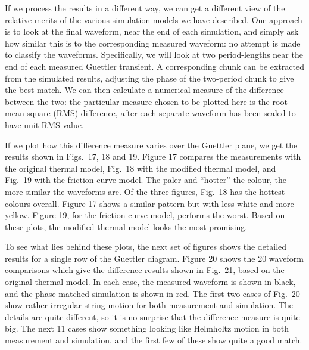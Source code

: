   If we process the results in a different way, we can get a different view of 
  the relative merits of the various simulation models we have described. One 
  approach is to look at the final waveform, near the end of each simulation, 
  and simply ask how similar this is to the corresponding measured waveform: no 
  attempt is made to classify the waveforms. Specifically, we will look at two 
  period-lengths near the end of each measured Guettler transient. A 
  corresponding chunk can be extracted from the simulated results, adjusting 
  the phase of the two-period chunk to give the best match. We can then 
  calculate a numerical measure of the difference between the two: the 
  particular measure chosen to be plotted here is the root-mean-square (RMS) 
  difference, after each separate waveform has been scaled to have unit RMS 
  value. 

  If we plot how this difference measure varies over the Guettler plane, we get 
  the results shown in Figs.\ 17, 18 and 19. Figure 17 compares the 
  measurements with the original thermal model, Fig.\ 18 with the modified 
  thermal model, and Fig.\ 19 with the friction-curve model. The paler and 
  ``hotter'' the colour, the more similar the waveforms are. Of the three 
  figures, Fig.\ 18 has the hottest colours overall. Figure 17 shows a similar 
  pattern but with less white and more yellow. Figure 19, for the friction 
  curve model, performs the worst. Based on these plots, the modified thermal 
  model looks the most promising. 

  To see what lies behind these plots, the next set of figures shows the 
  detailed results for a single row of the Guettler diagram. Figure 20 shows 
  the 20 waveform comparisons which give the difference results shown in Fig.\ 
  21, based on the original thermal model. In each case, the measured waveform 
  is shown in black, and the phase-matched simulation is shown in red. The 
  first two cases of Fig.\ 20 show rather irregular string motion for both 
  measurement and simulation. The details are quite different, so it is no 
  surprise that the difference measure is quite big. The next 11 cases show 
  something looking like Helmholtz motion in both measurement and simulation, 
  and the first few of these show quite a good match. 

